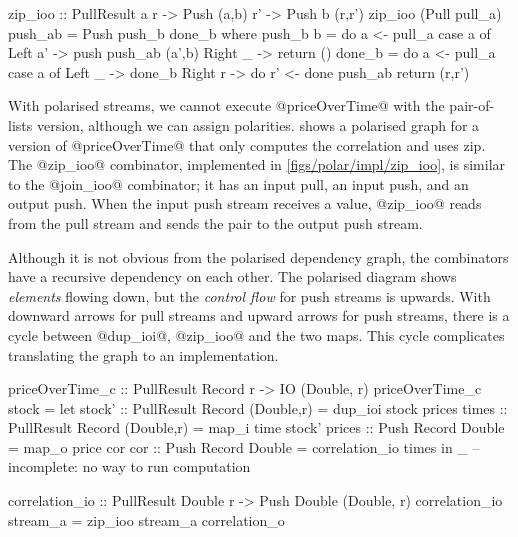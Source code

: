 \begin{haskell}[float,caption=Polarised implementation of \Hs/zip\_ioo/,label=figs/polar/impl/zip_ioo]
zip_ioo :: PullResult a r -> Push (a,b) r' -> Push b (r,r')
zip_ioo (Pull pull_a) push_ab = Push push_b done_b
 where
  push_b b = do
   a <- pull_a
   case a of
    Left a' -> push push_ab (a',b)
    Right _ -> return ()
  done_b = do
   a <- pull_a
   case a of
    Left _  -> done_b
    Right r -> do
     r' <- done push_ab
     return (r,r')
\end{haskell}


With polarised streams, we cannot execute @priceOverTime@ with the pair-of-lists version, although we can assign polarities.
 shows a polarised graph for a version of @priceOverTime@ that only computes the correlation and uses zip.
The @zip_ioo@ combinator, implemented in \cref{figs/polar/impl/zip_ioo}, is similar to the @join_ioo@ combinator; it has an input pull, an input push, and an output push.
When the input push stream receives a value, @zip_ioo@ reads from the pull stream and sends the pair to the output push stream.

Although it is not obvious from the polarised dependency graph, the combinators have a recursive dependency on each other.
The polarised diagram shows \emph{elements} flowing down, but the \emph{control flow} for push streams is upwards.
With downward arrows for pull streams and upward arrows for push streams, there is a cycle between @dup_ioi@, @zip_ioo@ and the two maps.
This cycle complicates translating the graph to an implementation.

\begin{haskell}[float,caption={Incomplete polarised implementation of \Hs/priceOverTime_c/},label=figs/polar/impl/priceOverTime_c]
priceOverTime_c :: PullResult Record r -> IO (Double, r)
priceOverTime_c stock =
  let stock' :: PullResult Record (Double,r)
              = dup_ioi stock prices
      times  :: PullResult Record (Double,r)
              = map_i time stock'
      prices :: Push Record Double
              = map_o price cor
      cor    :: Push Record Double
              = correlation_io times
  in _ -- incomplete: no way to run computation

correlation_io :: PullResult Double r -> Push Double (Double, r)
correlation_io stream_a = zip_ioo stream_a correlation_o
\end{haskell}

